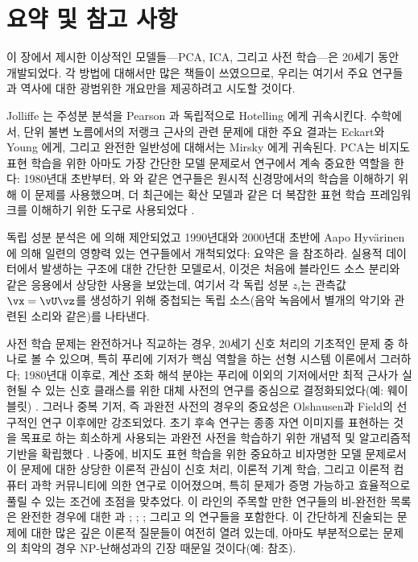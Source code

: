 \documentclass[../../book-main_ko.tex]{subfiles}
\begin{document}
\section{요약 및 참고 사항}

이 장에서 제시한 이상적인 모델들---PCA, ICA, 그리고 사전 학습---은 20세기 동안 개발되었다. 각 방법에 대해서만 많은 책들이 쓰였으므로, 우리는 여기서 주요 연구들과 역사에 대한 광범위한 개요만을 제공하려고 시도할 것이다.

Jolliffe \cite{Jolliffe1986}는 주성분 분석을 Pearson \cite{Pearson1901}과 독립적으로 Hotelling \cite{Hotelling1933}에게 귀속시킨다. 수학에서, 단위 불변 노름에서의 저랭크 근사의 관련 문제에 대한 주요 결과는 Eckart와 Young \cite{Eckart1936-ep}에게, 그리고 완전한 일반성에 대해서는 Mirsky \cite{Mirsky1960-ek}에게 귀속된다. PCA는 비지도 표현 학습을 위한 아마도 가장 간단한 모델 문제로서 연구에서 계속 중요한 역할을 한다: 1980년대 초반부터, \textcite{Oja1982SimplifiedNM}와 \textcite{Baldi89}와 같은 연구들은 원시적 신경망에서의 학습을 이해하기 위해 이 문제를 사용했으며, 더 최근에는 확산 모델과 같은 더 복잡한 표현 학습 프레임워크를 이해하기 위한 도구로 사용되었다 \cite{wang2024diffusion}.

독립 성분 분석은 \textcite{Ans-1985}에 의해 제안되었고 1990년대와 2000년대 초반에 Aapo Hyv\"{a}rinen에 의해 일련의 영향력 있는 연구들에서 개척되었다: 요약은 \textcite{Hyvrinen-2000}을 참조하라. 실용적 데이터에서 발생하는 구조에 대한 간단한 모델로서, 이것은 처음에 블라인드 소스 분리와 같은 응용에서 상당한 사용을 보았는데, 여기서 각 독립 성분 $z_i$는 관측값 $\vx = \vU \vz$를 생성하기 위해 중첩되는 독립 소스(음악 녹음에서 별개의 악기와 관련된 소리와 같은)를 나타낸다.

사전 학습 문제는 완전하거나 직교하는 경우, 20세기 신호 처리의 기초적인 문제 중 하나로 볼 수 있으며, 특히 푸리에 기저가 핵심 역할을 하는 선형 시스템 이론에서 그러하다; 1980년대 이후로, 계산 조화 해석 분야는 푸리에 이외의 기저에서만 최적 근사가 실현될 수 있는 신호 클래스를 위한 대체 사전의 연구를 중심으로 결정화되었다(예: 웨이블릿) \cite{Donoho1998-zf}. 그러나 중복 기저, 즉 과완전 사전의 경우의 중요성은 Olshausen과 Field의 선구적인 연구 \cite{Olshausen1996-ap,Olshausen1997-yv} 이후에만 강조되었다. 초기 후속 연구는 종종 자연 이미지를 표현하는 것을 목표로 하는 희소하게 사용되는 과완전 사전을 학습하기 위한 개념적 및 알고리즘적 기반을 확립했다 \cite{Donoho2001-tl,DonohoD2003-PNAS,Elad2006-yi,Murray2007-cw,aharon2006k,Mairal2014-nq,Gribonval2015-fy}. 나중에, 비지도 표현 학습을 위한 중요하고 비자명한 모델 문제로서 이 문제에 대한 상당한 이론적 관심이 신호 처리, 이론적 기계 학습, 그리고 이론적 컴퓨터 과학 커뮤니티에 의한 연구로 이어졌으며, 특히 문제가 증명 가능하고 효율적으로 풀릴 수 있는 조건에 초점을 맞추었다. 이 라인의 주목할 만한 연구들의 비-완전한 목록은 완전한 경우에 대한 \textcite{Spielman2012-tl}과 \textcite{sun2017complete_a}; \textcite{pmlr-v40-Arora15}; \textcite{Barak2015-uu}; 그리고 \textcite{Qu2020Geometric}의 연구들을 포함한다. 이 간단하게 진술되는 문제에 대한 많은 깊은 이론적 질문들이 여전히 열려 있는데, 아마도 부분적으로는 문제의 최악의 경우 NP-난해성과의 긴장 때문일 것이다(예: \textcite{Tillmann2015-up} 참조).
\end{document}
